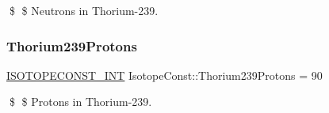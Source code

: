\$ \$ Neutrons in Thorium-\/239. \mbox{\label{group___isotope_const-_thorium-_th239_gafaf295d963b5751cc6ffc0f604b58378}} 
\subsubsection{\texorpdfstring{Thorium239\+Protons}{Thorium239Protons}}
{\footnotesize\ttfamily \mbox{\hyperlink{group___isotope_const-_macros_ga5f18360b3e99483a35c32d789e62621c}{I\+S\+O\+T\+O\+P\+E\+C\+O\+N\+S\+T\+\_\+\+I\+NT}} Isotope\+Const\+::\+Thorium239\+Protons = 90}

\$ \$ Protons in Thorium-\/239. 